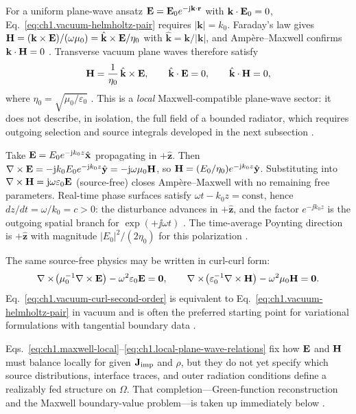 For a uniform plane-wave ansatz $\mathbf{E}=\mathbf{E}_0 e^{-\mathrm{j}\mathbf{k}\cdot\mathbf{r}}$ with $\mathbf{k}\cdot\mathbf{E}_0=0$, Eq.~\eqref{eq:ch1.vacuum-helmholtz-pair} requires $|\mathbf{k}|=k_0$. Faraday's law gives $\mathbf{H}=(\mathbf{k}\times\mathbf{E})/(\omega\mu_0)=\hat{\mathbf{k}}\times\mathbf{E}/\eta_0$ with $\hat{\mathbf{k}}=\mathbf{k}/|\mathbf{k}|$, and Amp\`ere--Maxwell confirms $\mathbf{k}\cdot\mathbf{H}=0$ \cite{stratton1941,jackson1999}. Transverse vacuum plane waves therefore satisfy
\begin{equation}
\label{eq:ch1.local-plane-wave-relations}
\mathbf{H}=\frac{1}{\eta_0}\,\hat{\mathbf{k}}\times\mathbf{E},\qquad
\hat{\mathbf{k}}\cdot\mathbf{E}=0,\qquad
\hat{\mathbf{k}}\cdot\mathbf{H}=0,
\end{equation}
where $\eta_0=\sqrt{\mu_0/\varepsilon_0}$ \cite{stratton1941,jackson1999}. This is a \emph{local} Maxwell-compatible plane-wave sector: it does not describe, in isolation, the full field of a bounded radiator, which requires outgoing selection and source integrals developed in the next subsection \cite{stratton1941}.

Take $\mathbf{E}=E_0 e^{-\mathrm{j} k_0 z}\hat{\mathbf{x}}$ propagating in $+\hat{\mathbf{z}}$. Then $\nabla\times\mathbf{E}=-\mathrm{j} k_0 E_0 e^{-\mathrm{j} k_0 z}\hat{\mathbf{y}}=-\mathrm{j}\omega\mu_0\mathbf{H}$, so $\mathbf{H}=(E_0/\eta_0)e^{-\mathrm{j} k_0 z}\hat{\mathbf{y}}$. Substituting into $\nabla\times\mathbf{H}=\mathrm{j}\omega\varepsilon_0\mathbf{E}$ (source-free) closes Amp\`ere--Maxwell with no remaining free parameters. Real-time phase surfaces satisfy $\omega t-k_0 z=\mathrm{const}$, hence $dz/dt=\omega/k_0=c>0$: the disturbance advances in $+\hat{\mathbf{z}}$, and the factor $e^{-\jj k_0 z}$ is the outgoing spatial branch for $\exp(+\jj\omega t)$ \cite{stratton1941,jackson1999}. The time-average Poynting direction is $+\hat{\mathbf{z}}$ with magnitude $|E_0|^2/(2\eta_0)$ for this polarization \cite{stratton1941}.

The same source-free physics may be written in curl-curl form:
\begin{equation}
\label{eq:ch1.vacuum-curl-second-order}
\nabla\times\!\left(\mu_0^{-1}\nabla\times \mathbf{E}\right)-\omega^2\varepsilon_0\mathbf{E}=\mathbf{0},\qquad
\nabla\times\!\left(\varepsilon_0^{-1}\nabla\times \mathbf{H}\right)-\omega^2\mu_0\mathbf{H}=\mathbf{0}.
\end{equation}
Eq.~\eqref{eq:ch1.vacuum-curl-second-order} is equivalent to Eq.~\eqref{eq:ch1.vacuum-helmholtz-pair} in vacuum and is often the preferred starting point for variational formulations with tangential boundary data \cite{stratton1941}.

Eqs.~\eqref{eq:ch1.maxwell-local}--\eqref{eq:ch1.local-plane-wave-relations} fix how $\mathbf{E}$ and $\mathbf{H}$ must balance locally for given $\mathbf{J}_{\mathrm{imp}}$ and $\rho$, but they do not yet specify which source distributions, interface traces, and outer radiation conditions define a realizably fed structure on $\Omega$. That completion---Green-function reconstruction and the Maxwell boundary-value problem---is taken up immediately below \cite{stratton1941}.


